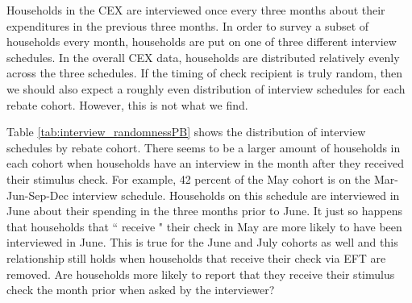 



Households in the CEX are interviewed once every three months about their expenditures in the previous three months. 
In order to survey a subset of households every month, households are put on one of three different interview 
schedules. In the overall CEX data, households are distributed relatively evenly across the three schedules.
 If the timing of check recipient is truly random, then we should also expect a roughly even distribution of
  interview schedules for each rebate cohort. However, this is not what we find.

Table \ref{tab:interview_randomnessPB} shows the distribution of interview schedules by rebate cohort. There seems to be
 a larger amount of households in each cohort when households have an interview in the month after they received 
 their stimulus check. For example, 42 percent of the May cohort is on the Mar-Jun-Sep-Dec interview schedule.
  Households on this schedule are interviewed in June about their spending in the three months prior to June. 
  It just so happens that households that `` receive " their check in May are more likely to have been interviewed
   in June. This is true for the June and July cohorts as well and this relationship still holds when households
    that receive their check via EFT are removed. Are households more likely to report that they receive their 
    stimulus check the month prior when asked by the interviewer?

\begin{landscape}
    
\end{landscape}